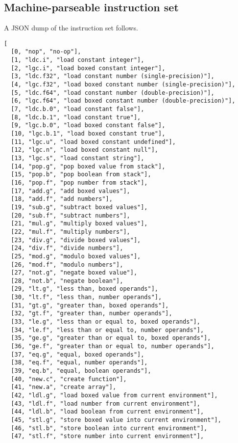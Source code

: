 \subsection{Machine-parseable instruction set}

A JSON dump of the instruction set follows.

\begin{verbatim}
[
  [0, "nop", "no-op"],
  [1, "ldc.i", "load constant integer"],
  [2, "lgc.i", "load boxed constant integer"],
  [3, "ldc.f32", "load constant number (single-precision)"],
  [4, "lgc.f32", "load boxed constant number (single-precision)"],
  [5, "ldc.f64", "load constant number (double-precision)"],
  [6, "lgc.f64", "load boxed constant number (double-precision)"],
  [7, "ldc.b.0", "load constant false"],
  [8, "ldc.b.1", "load constant true"],
  [9, "lgc.b.0", "load boxed constant false"],
  [10, "lgc.b.1", "load boxed constant true"],
  [11, "lgc.u", "load boxed constant undefined"],
  [12, "lgc.n", "load boxed constant null"],
  [13, "lgc.s", "load constant string"],
  [14, "pop.g", "pop boxed value from stack"],
  [15, "pop.b", "pop boolean from stack"],
  [16, "pop.f", "pop number from stack"],
  [17, "add.g", "add boxed values"],
  [18, "add.f", "add numbers"],
  [19, "sub.g", "subtract boxed values"],
  [20, "sub.f", "subtract numbers"],
  [21, "mul.g", "multiply boxed values"],
  [22, "mul.f", "multiply numbers"],
  [23, "div.g", "divide boxed values"],
  [24, "div.f", "divide numbers"],
  [25, "mod.g", "modulo boxed values"],
  [26, "mod.f", "modulo numbers"],
  [27, "not.g", "negate boxed value"],
  [28, "not.b", "negate boolean"],
  [29, "lt.g", "less than, boxed operands"],
  [30, "lt.f", "less than, number operands"],
  [31, "gt.g", "greater than, boxed operands"],
  [32, "gt.f", "greater than, number operands"],
  [33, "le.g", "less than or equal to, boxed operands"],
  [34, "le.f", "less than or equal to, number operands"],
  [35, "ge.g", "greater than or equal to, boxed operands"],
  [36, "ge.f", "greater than or equal to, number operands"],
  [37, "eq.g", "equal, boxed operands"],
  [38, "eq.f", "equal, number operands"],
  [39, "eq.b", "equal, boolean operands"],
  [40, "new.c", "create function"],
  [41, "new.a", "create array"],
  [42, "ldl.g", "load boxed value from current environment"],
  [43, "ldl.f", "load number from current environment"],
  [44, "ldl.b", "load boolean from current environment"],
  [45, "stl.g", "store boxed value into current environment"],
  [46, "stl.b", "store boolean into current environment"],
  [47, "stl.f", "store number into current environment"],

\end{verbatim}
